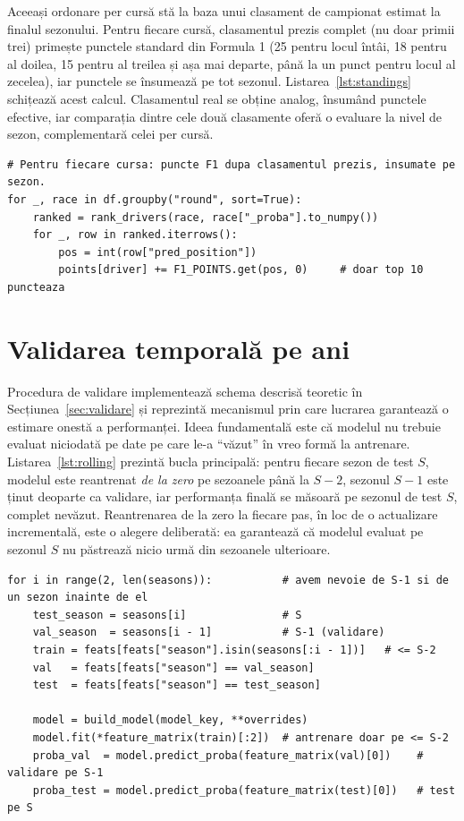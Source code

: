 \documentclass[12pt,a4paper]{report}
\begin{document}
Aceeași ordonare per cursă stă la baza unui clasament de campionat estimat la finalul sezonului.
Pentru fiecare cursă, clasamentul prezis complet (nu doar primii trei) primește punctele standard
din Formula 1 (25 pentru locul întâi, 18 pentru al doilea, 15 pentru al treilea și așa mai departe,
până la un punct pentru locul al zecelea), iar punctele se însumează pe tot sezonul.
Listarea~\ref{lst:standings} schițează acest calcul. Clasamentul real se obține analog, însumând
punctele efective, iar comparația dintre cele două clasamente oferă o evaluare la nivel de sezon,
complementară celei per cursă.

\begin{lstlisting}[caption={Agregarea probabilitatilor intr-un clasament de campionat prezis.}, label={lst:standings}]
# Pentru fiecare cursa: puncte F1 dupa clasamentul prezis, insumate pe sezon.
for _, race in df.groupby("round", sort=True):
    ranked = rank_drivers(race, race["_proba"].to_numpy())
    for _, row in ranked.iterrows():
        pos = int(row["pred_position"])
        points[driver] += F1_POINTS.get(pos, 0)     # doar top 10 puncteaza
\end{lstlisting}

\section{Validarea temporală pe ani}
\label{sec:validimpl}

Procedura de validare implementează schema descrisă teoretic în Secțiunea~\ref{sec:validare} și
reprezintă mecanismul prin care lucrarea garantează o estimare onestă a performanței. Ideea
fundamentală este că modelul nu trebuie evaluat niciodată pe date pe care le-a ``văzut'' în vreo
formă la antrenare. Listarea~\ref{lst:rolling} prezintă bucla principală: pentru fiecare sezon de
test $S$, modelul este reantrenat \emph{de la zero} pe sezoanele până la $S-2$, sezonul $S-1$ este
ținut deoparte ca validare, iar performanța finală se măsoară pe sezonul de test $S$, complet
nevăzut. Reantrenarea de la zero la fiecare pas, în loc de o actualizare incrementală, este o
alegere deliberată: ea garantează că modelul evaluat pe sezonul $S$ nu păstrează nicio urmă din
sezoanele ulterioare.

\begin{lstlisting}[caption={Bucla de validare temporala cu separare train / validare / test pe ani.}, label={lst:rolling}]
for i in range(2, len(seasons)):           # avem nevoie de S-1 si de un sezon inainte de el
    test_season = seasons[i]               # S
    val_season  = seasons[i - 1]           # S-1 (validare)
    train = feats[feats["season"].isin(seasons[:i - 1])]   # <= S-2
    val   = feats[feats["season"] == val_season]
    test  = feats[feats["season"] == test_season]

    model = build_model(model_key, **overrides)
    model.fit(*feature_matrix(train)[:2])  # antrenare doar pe <= S-2
    proba_val  = model.predict_proba(feature_matrix(val)[0])    # validare pe S-1
    proba_test = model.predict_proba(feature_matrix(test)[0])   # test pe S
\end{lstlisting}
\end{document}
